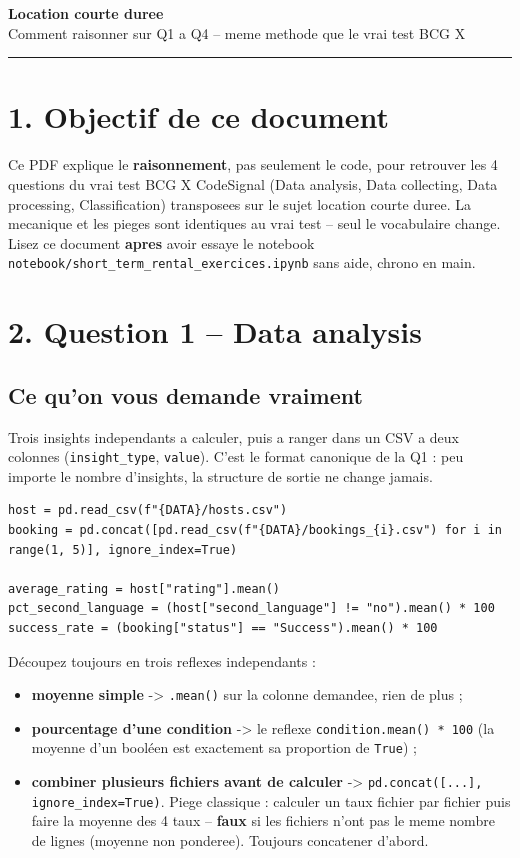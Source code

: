 \documentclass[11pt]{article}
\newcommand{\exhead}[1]{\subsection{#1}}
\begin{document}
\begin{center}
  {\huge\bfseries\color{bcg} Location courte duree}\\[4pt]
  {\large Comment raisonner sur Q1 a Q4 -- meme methode que le vrai test BCG X}
\end{center}
\vspace{4pt}\hrule\vspace{10pt}

\section{1. Objectif de ce document}
Ce PDF explique le \textbf{raisonnement}, pas seulement le code, pour
retrouver les 4 questions du vrai test BCG X CodeSignal (Data analysis,
Data collecting, Data processing, Classification) transposees sur le sujet location courte duree. La mecanique
et les pieges sont identiques au vrai test -- seul le vocabulaire change.
Lisez ce document \textbf{apres} avoir essaye le notebook
\texttt{notebook/short\_term\_rental\_exercices.ipynb} sans
aide, chrono en main.

\section{2. Question 1 -- Data analysis}

\exhead{Ce qu'on vous demande vraiment}
Trois \og insights \fg{} independants a calculer, puis a ranger dans un
CSV a deux colonnes (\texttt{insight\_type}, \texttt{value}). C'est le
format canonique de la Q1 : peu importe le nombre d'insights, la structure
de sortie ne change jamais.

\begin{lstlisting}
host = pd.read_csv(f"{DATA}/hosts.csv")
booking = pd.concat([pd.read_csv(f"{DATA}/bookings_{i}.csv") for i in range(1, 5)], ignore_index=True)

average_rating = host["rating"].mean()
pct_second_language = (host["second_language"] != "no").mean() * 100
success_rate = (booking["status"] == "Success").mean() * 100
\end{lstlisting}

\begin{explik}
D\'ecoupez toujours en trois reflexes independants :
\begin{itemize}[nosep]
  \item \textbf{moyenne simple} -> \texttt{.mean()} sur la colonne
        demandee, rien de plus ;
  \item \textbf{pourcentage d'une condition} -> le reflexe
        \texttt{condition.mean() * 100} (la moyenne d'un bool\'een est
        exactement sa proportion de \texttt{True}) ;
  \item \textbf{combiner plusieurs fichiers avant de calculer} ->
        \texttt{pd.concat([...], ignore\_index=True)}. Piege classique :
        calculer un taux fichier par fichier puis faire la moyenne des 4
        taux -- \textbf{faux} si les fichiers n'ont pas le meme nombre de
        lignes (moyenne non ponderee). Toujours concatener d'abord.
\end{itemize}
\end{explik}
\end{document}
